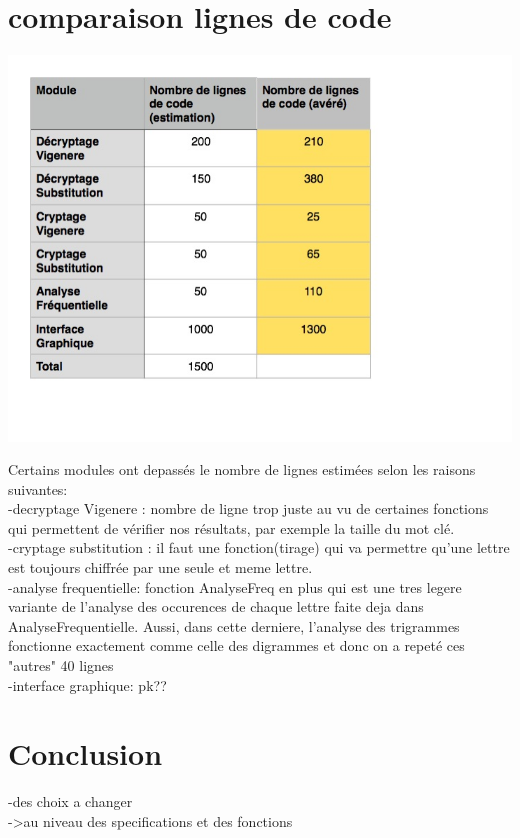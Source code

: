 \documentclass[a4]{article}
\begin{document}
	\section{comparaison lignes de code}
		\begin{center}\includegraphics[scale=0.5]{preview.jpg}\end{center}
		Certains modules ont depassés le nombre de lignes estimées selon les raisons suivantes: \\
		-decryptage Vigenere : nombre de ligne trop juste au vu de certaines fonctions qui permettent de vérifier
		 nos résultats, par exemple la taille du mot clé. \\
		-cryptage substitution : il faut une fonction(tirage) qui va permettre qu'une lettre est toujours chiffrée
		 par une seule et meme lettre. \\
		-analyse frequentielle: fonction AnalyseFreq en plus qui est une tres legere variante de l'analyse des occurences de 
		chaque lettre faite deja dans AnalyseFrequentielle. Aussi, dans cette derniere, l'analyse des trigrammes fonctionne exactement
		comme celle des digrammes et donc on a repeté ces "autres" 40 lignes \\
		-interface graphique: pk??
		
	
	\section{Conclusion}
	-des choix a changer \\
	->au niveau des specifications et des fonctions \\ \\
	
\end{document}
